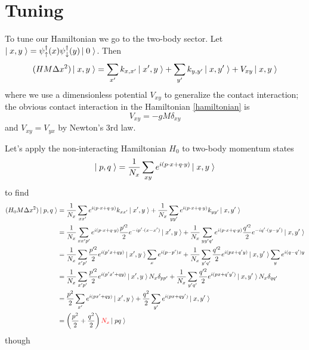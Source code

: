 \section{Tuning}\label{sec:tuning}

To tune our Hamiltonian we go to the two-body sector.
Let $\left|\;x,y\;\right\rangle = \psi{}^{\dagger}_{\uparrow}(x) \psi{}^{\dagger}_{\downarrow}(y) \left|\;0\;\right\rangle$.
Then
\begin{equation}
	(HM\Delta x^2) \left|\;x,y\;\right\rangle = \sum_{x'} k_{x,x'}\left|\;x',y\;\right\rangle + \sum_{y'} k_{y,y'}\left|\;x,y'\;\right\rangle + V_{xy} \left|\;x,y\;\right\rangle
\end{equation}
where we use a dimensionless potential $V_{xy}$ to generalize the contact interaction;
the obvious contact interaction in the Hamiltonian \eqref{hamiltonian} is
\begin{equation}
	V_{xy} = - gM \delta_{xy}
\end{equation}
and $V_{xy}=V_{yx}$ by Newton's 3rd law.

Let's apply the non-interacting Hamiltonian $H_0$ to two-body momentum states
\begin{equation}
	\left|\;p,q\;\right\rangle = \frac{1}{N_x}\sum_{xy} e^{i(p\cdot x + q \cdot y)} \left|\;x,y\;\right\rangle
\end{equation}
to find
\begin{align}
	(H_0 M\Delta x^2) \left|\;p,q\;\right\rangle
	&=
			\frac{1}{N_x} \sum_{xx'} e^{i(p\cdot x + q \cdot y)} k_{xx'}\left|\;x',y\;\right\rangle
		+	\frac{1}{N_x} \sum_{yy'} e^{i(p\cdot x + q \cdot y)} k_{yy'}\left|\;x,y'\;\right\rangle
	\\
	&=
			\frac{1}{N_x} \sum_{xx'p'} e^{i(p\cdot x + q \cdot y)} \frac{p'^2}{2} e^{-i p'\cdot(x-x')}\left|\;x',y\;\right\rangle
		+	\frac{1}{N_x} \sum_{yy'q'} e^{i(p\cdot x + q \cdot y)} \frac{q'^2}{2} e^{-i q'\cdot(y-y')}\left|\;x,y'\;\right\rangle
	\\
	&=
			\frac{1}{N_x} \sum_{x'p'} \frac{p'^2}{2} e^{i(p'x+qy)} \left|\;x',y\;\right\rangle \sum_{x} e^{i(p-p')x}
		+	\frac{1}{N_x} \sum_{y'q'} \frac{q'^2}{2} e^{i(px+q'y)} \left|\;x,y'\;\right\rangle \sum_{y} e^{i(q-q')y}
	\\
	&=
			\frac{1}{N_x} \sum_{x'p'} \frac{p'^2}{2} e^{i(p'x'+qy)} \left|\;x',y\;\right\rangle N_x \delta_{pp'}
		+	\frac{1}{N_x} \sum_{y'q'} \frac{q'^2}{2} e^{i(px+q'y')} \left|\;x,y'\;\right\rangle N_x \delta_{qq'}
	\\
	&=
			\frac{p^2}{2}\sum_{x'} e^{i(px'+qy)} \left|\;x',y\;\right\rangle
		+	\frac{q^2}{2}\sum_{y'} e^{i(px+qy')} \left|\;x,y'\;\right\rangle
	\\
	&=
		\left(\frac{p^2}{2} + \frac{q^2}{2}\right) {\color{red} N_x} \left|\;pq\;\right\rangle
\end{align}
though 

